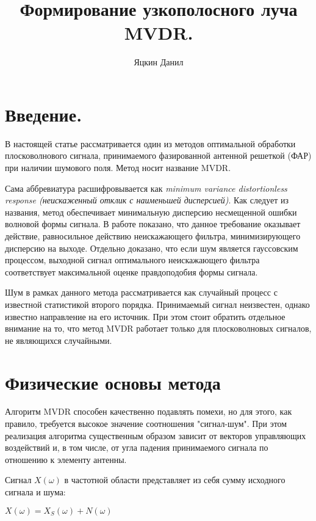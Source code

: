 \documentclass{article}
\title{Формирование узкополосного луча MVDR.}
\author{Яцкин Данил}
\begin{document}
\maketitle

\section{Введение.}
 
В настоящей  статье рассматривается один из методов оптимальной обработки плосковолнового сигнала, принимаемого фазированной антенной решеткой (ФАР) при наличии шумового поля. Метод носит название MVDR.
 
Сама аббревиатура расшифровывается как \textit{minimum variance distortionless response (неискаженный отклик с наименьшей дисперсией)}. Как следует из названия, метод обеспечивает минимальную дисперсию несмещенной ошибки  волновой формы сигнала. В работе \cite{Trees2002} показано, что данное требование оказывает действие, равносильное действию неискажающего фильтра, минимизирующего дисперсию на выходе. Отдельно доказано, что если шум является гауссовским процессом, выходной сигнал оптимального неискажающего фильтра соответствует максимальной оценке правдоподобия формы сигнала.

Шум в рамках данного метода рассматривается как случайный процесс с известной статистикой второго порядка. Принимаемый сигнал неизвестен, однако известно направление на его источник. При этом стоит обратить отдельное внимание на то, что метод MVDR работает только для плосковолновых сигналов, не являющихся случайными.






\section{Физические основы метода}

Алгоритм MVDR способен качественно подавлять помехи, но для этого, как правило, требуется высокое значение соотношения "сигнал-шум". При этом реализация алгоритма существенным образом зависит от векторов управляющих воздействий и, в том числе, от угла падения принимаемого сигнала по отношению к элементу антенны.

Сигнал $X(\omega)$ в частотной области представляет из себя сумму исходного сигнала и шума:

\begin{center}
$X(\omega) = X_{S}(\omega) + N(\omega)$
\end{center}
\end{document}
